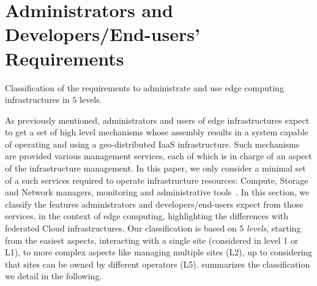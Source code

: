 
\section{Administrators and Developers/End-users' Requirements}
\label{sec:requirements}

%   

\begin{table*}
    \centering
        
    \caption{Classification of the requirements to administrate and use edge
    computing infrastructures in $5$ levels.}
    \label{tab:requirements}
\end{table*}

As previously mentioned, administrators and users of edge infrastructures
expect to get a set of high level mechanisms whose assembly results in a system
capable of operating and using a geo-distributed IaaS infrastructure.
Such mechanisms are provided various management services, each of which is in
charge of an aspect of the infrastructure management. In this paper, we
only consider a minimal set of a such services required to operate
infrastructure resources: Compute, Storage and Network managers, monitoring and
administrative tools~\cite{moreno2012csp}.
In this section, we classify the features administrators and
developers/end-users expect from those services, in the context of edge
computing, highlighting the differences with federated Cloud infrastructures.
Our classification is based on $5$ \emph{levels}, starting from the easiest
aspects, \ie interacting with a single site (considered in level 1 or L1), to
more complex aspects like managing multiple sites (L2), up to considering that
sites can be owned by different operators (L5).
 summarizes the classification we detail in the following. 

